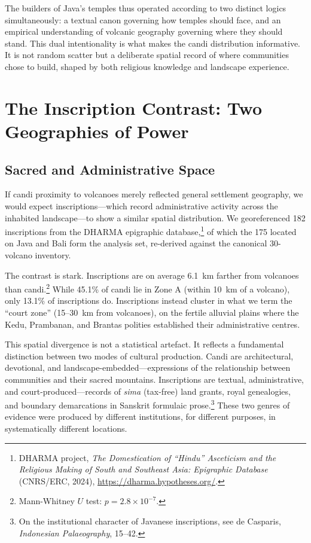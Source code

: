 \documentclass[12pt,a4paper]{article}
\begin{document}
The builders of Java's temples thus operated according to two distinct logics simultaneously: a textual canon governing how temples should face, and an empirical understanding of volcanic geography governing where they should stand.
This dual intentionality is what makes the candi distribution informative.
It is not random scatter but a deliberate spatial record of where communities chose to build, shaped by both religious knowledge and landscape experience.


\section{The Inscription Contrast: Two Geographies of Power}

\subsection{Sacred and Administrative Space}

If candi proximity to volcanoes merely reflected general settlement geography, we would expect inscriptions---which record administrative activity across the inhabited landscape---to show a similar spatial distribution.
We georeferenced 182 inscriptions from the DHARMA epigraphic database,\footnote{DHARMA project, \emph{The Domestication of ``Hindu'' Asceticism and the Religious Making of South and Southeast Asia: Epigraphic Database} (CNRS/ERC, 2024), \url{https://dharma.hypotheses.org/}.} of which the 175 located on Java and Bali form the analysis set, re-derived against the canonical 30-volcano inventory.

The contrast is stark.
Inscriptions are on average 6.1~km farther from volcanoes than candi.\footnote{Mann-Whitney $U$ test: $p = 2.8 \times 10^{-7}$.}
While 45.1\% of candi lie in Zone A (within 10~km of a volcano), only 13.1\% of inscriptions do.
Inscriptions instead cluster in what we term the ``court zone'' (15--30~km from volcanoes), on the fertile alluvial plains where the Kedu, Prambanan, and Brantas polities established their administrative centres.

This spatial divergence is not a statistical artefact.
It reflects a fundamental distinction between two modes of cultural production.
Candi are architectural, devotional, and landscape-embedded---expressions of the relationship between communities and their sacred mountains.
Inscriptions are textual, administrative, and court-produced---records of \emph{sima} (tax-free) land grants, royal genealogies, and boundary demarcations in Sanskrit formulaic prose.\footnote{On the institutional character of Javanese inscriptions, see de Casparis, \emph{Indonesian Palaeography}, 15--42.}
These two genres of evidence were produced by different institutions, for different purposes, in systematically different locations.
\end{document}
